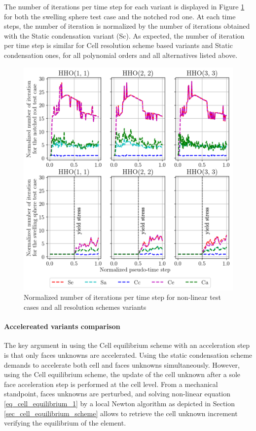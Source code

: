 The number of iterations per time step for each variant
is displayed in Figure \ref{fig_acceleration_res_0} for both the swelling sphere test case
and the notched rod one.
At each time steps, the number of iteration is normalized by the number of iterations obtained with the
Static condensation variant (Sc).
As expected, the number of iteration per time step is similar for Cell resolution scheme based variants and Static condensation ones, for all polynomial orders and all alternatives listed above.

\begin{figure}[H]
    \centering
    \includegraphics[width=12.cm]{../chapter_002_hho_mechanics/figures/plot_global_iterations__4_ordn.png}
    \caption{Normalized number of iterations per time step for non-linear test cases and all resolution schemes variants}
    \label{fig_acceleration_res_0}
\end{figure}

\paragraph{Accelereated variants comparison}

The key argument in using the
Cell equilibrium scheme with an acceleration step is that 
only faces unknowns are accelerated.
Using the static condensation scheme demands to accelerate both cell and faces unknowns simultaneously.
However, using the Cell equilibrium scheme, the update of the cell unknown after a sole face acceleration step is performed at the cell level.
From a mechanical standpoint, faces unknowns are perturbed, and solving non-linear equation \eqref{eq_cell_equilibrium_1} by a local Newton algorithm as depicted in Section \ref{sec_cell_equilibrium_scheme} allows to retrieve the cell unknown increment verifying the equilibrium of the element.

